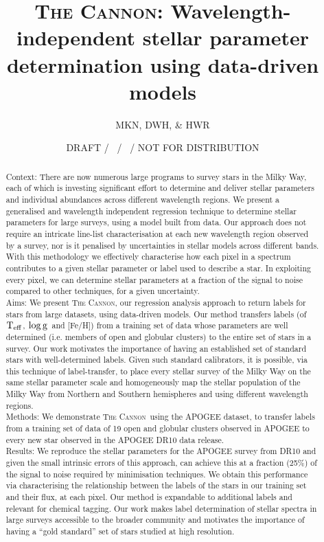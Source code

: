 \documentclass[12pt, preprint]{aastex}
\newcommand{\teff}{\mbox{$\rm T_{eff}$}}
\newcommand{\logg}{\mbox{$\rm \log g$}}
\newcommand{\tc}{\textsc{The Cannon}}
\begin{document}
\title{\textsc{The Cannon:} Wavelength-independent stellar parameter determination using data-driven models}
\author{
  MKN,
  DWH,
  \&
  HWR}
\date{DRAFT / \gitdate\ / \githash\ / NOT FOR DISTRIBUTION}



\begin{abstract}

Context: There are now numerous large programs to survey stars in the Milky Way, each of which is investing significant effort to determine and deliver stellar parameters and individual abundances across different wavelength regions. We present a generalised and wavelength independent regression technique to determine stellar parameters for large surveys, using a model built from data. Our approach does not require an intricate line-list characterisation at each new wavelength region observed by a survey, nor is it penalised by uncertainties in stellar models across different bands. With this methodology we effectively characterise how each pixel in a spectrum contributes to a given stellar parameter or label used to describe a star. In exploiting every pixel, we can determine stellar parameters at a fraction of the signal to noise compared to other techniques, for a given uncertainty. \\
Aims: We present \tc, our regression analysis approach to return labels for stars from large datasets, using data-driven models.  Our method transfers labels (of \teff, \logg\ and [Fe/H]) from a training set of data whose parameters are well determined (i.e. members of open and globular clusters) to the entire set of stars in a survey. Our work motivates the importance of having an established set of standard stars with well-determined labels. Given such standard calibrators, it is possible, via this technique of label-transfer, to place every stellar survey of the Milky Way on the same stellar parameter scale and homogeneously map the stellar population of the Milky Way from Northern and Southern hemispheres and using different wavelength regions. \\
Methods: We demonstrate \tc\ using the APOGEE dataset, to transfer labels from a training set of data of 19 open and globular clusters observed in APOGEE to every new star observed in the APOGEE DR10 data release. \\
Results:   We reproduce the stellar parameters for the APOGEE survey from DR10 and given the small intrinsic errors of this approach, can achieve this at a fraction (25\%) of the signal to noise required by minimisation techniques.   We obtain this performance via characterising the relationship between the labels of the stars in our training set and their flux, at each pixel. Our method is expandable to additional labels and relevant for chemical tagging.  Our work makes label determination of stellar spectra in large surveys accessible to the broader community and motivates the importance of having a ``gold standard'' set of stars studied at high resolution. \\



\end{abstract}
\end{document}
